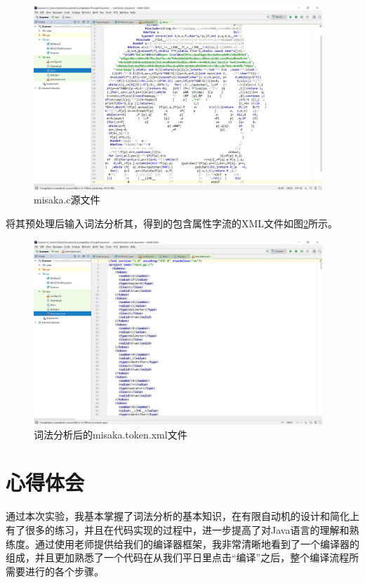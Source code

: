 \documentclass[UTF8, twoside, titlepage]{ctexart}
\begin{document}
\begin{figure}[htbp]
	\centering
	\includegraphics[width=0.97\textwidth]{images/misaka-c.png}
	\caption{misaka.c源文件}
	\label{fig:misaka-c}
\end{figure}

将其预处理后输入词法分析其，得到的包含属性字流的XML文件如图\ref{fig:misaka-token}所示。

\begin{figure}[htbp]
	\centering
	\includegraphics[width=0.97\textwidth]{images/misaka-token.png}
	\caption{词法分析后的misaka.token.xml文件}
	\label{fig:misaka-token}
\end{figure}

\section{心得体会}
通过本次实验，我基本掌握了词法分析的基本知识，在有限自动机的设计和简化上有了很多的练习，并且在代码实现的过程中，进一步提高了对Java语言的理解和熟练度。通过使用老师提供给我们的编译器框架，我非常清晰地看到了一个编译器的组成，并且更加熟悉了一个代码在从我们平日里点击“编译”之后，整个编译流程所需要进行的各个步骤。
\end{document}
